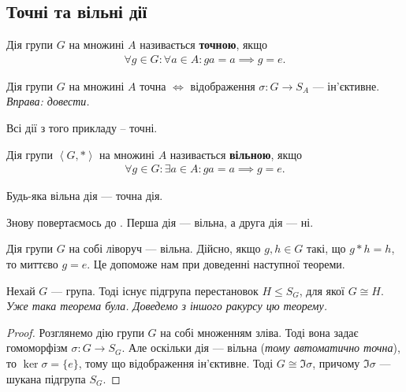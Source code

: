 \documentclass{math_library}
\begin{document}
\subsection{Точні та вільні дії}
\begin{definition}
Дія групи $G$ на множині $A$ називається \textbf{точною}, якщо
\begin{align*}
\forall g \in G: \forall a \in A: ga = a \implies g = e.
\end{align*}
\end{definition}

\begin{proposition}
Дія групи $G$ на множині $A$ точна $\iff$ відображення $\sigma \colon G \to S_A$ --- ін'єктивне.\\
\textit{Вправа: довести.}
\end{proposition}

\begin{example}
Всі дії з того прикладу -- точні.
\end{example}

\begin{definition}
Дія групи $\left< G,*\right>$ на множині $A$ називається \textbf{вільною}, якщо
\begin{align*}
\forall g \in G: \exists a \in A: ga = a \implies g = e.
\end{align*}
\end{definition}

\begin{remark}
Будь-яка вільна дія --- точна дія.
\end{remark}

\begin{example}
Знову повертаємось до . Перша дія --- вільна, а друга дія --- ні.
\end{example}

\begin{example}
Дія групи $G$ на собі ліворуч --- вільна. Дійсно, якщо $g,h \in G$ такі, що $g*h = h$, то миттєво $g = e$. Це допоможе нам при доведенні наступної теореми.
\end{example}

\begin{theorem}
Нехай $G$ --- група. Тоді існує підгрупа перестановок $H \leq S_G$, для якої $G \cong H$.\\
\textit{Уже така теорема була. Доведемо з іншого ракурсу цю теорему.}
\end{theorem}

\begin{proof}
Розглянемо дію групи $G$ на собі множенням зліва. Тоді вона задає гомоморфізм $\sigma \colon G \to S_G$. Але оскільки дія --- вільна (\textit{тому автоматично точна}), то $\ker \sigma = \{e\}$, тому що відображення ін'єктивне. Тоді $G \cong \Im \sigma$, причому $\Im \sigma$ --- шукана підгрупа $S_G$.
\end{proof}
\end{document}
